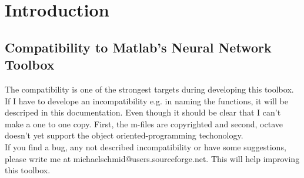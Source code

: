 \chapter{Introduction}

\section{Compatibility to Matlab's \texttrademark Neural Network Toolbox}
The compatibility is one of the strongest targets during developing this toolbox.
If I have to develope an incompatibility e.g. in naming the functions, it will be descriped
in this documentation. Even though it should be clear that I can't make a one to one copy.  First,
the m-files are copyrighted and second, octave doesn't yet support the object oriented-programming techonology.\\

If you find a bug, any not described incompatibility or have some suggestions, please write me at
michaelschmid@users.sourceforge.net. This will help improving this toolbox.






